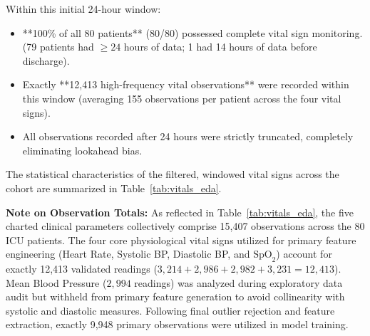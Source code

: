 \documentclass[12pt,a4paper,oneside]{report}
\begin{document}
Within this initial 24-hour window:
\begin{itemize}
    \item **100\% of all 80 patients** (80/80) possessed complete vital sign monitoring. (79 patients had $\ge 24$ hours of data; 1 had 14 hours of data before discharge).
    \item Exactly **12,413 high-frequency vital observations** were recorded within this window (averaging 155 observations per patient across the four vital signs).
    \item All observations recorded after 24 hours were strictly truncated, completely eliminating lookahead bias.
\end{itemize}

The statistical characteristics of the filtered, windowed vital signs across the cohort are summarized in Table~\ref{tab:vitals_eda}.

\begin{table}[htbp]
\centering
\caption{Exploratory Data Analysis: Statistical Distribution of 24-Hour Windowed Vital Signs ($N=80$ Patients)}
\label{tab:vitals_eda}
\end{table}

\noindent \textbf{Note on Observation Totals:} As reflected in Table~\ref{tab:vitals_eda}, the five charted clinical parameters collectively comprise 15,407 observations across the 80 ICU patients. The four core physiological vital signs utilized for primary feature engineering (Heart Rate, Systolic BP, Diastolic BP, and $\text{SpO}_2$) account for exactly 12,413 validated readings ($3,214 + 2,986 + 2,982 + 3,231 = 12,413$). Mean Blood Pressure ($2,994$ readings) was analyzed during exploratory data audit but withheld from primary feature generation to avoid collinearity with systolic and diastolic measures. Following final outlier rejection and feature extraction, exactly 9,948 primary observations were utilized in model training.
\end{document}
